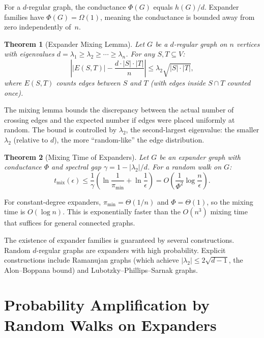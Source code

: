 \documentclass[twoside,12pt]{book}
\theoremstyle{plain}
\newtheorem{theorem}{Theorem}[chapter]
\theoremstyle{definition}
\theoremstyle{remark}
\begin{document}
For a $d$-regular graph, the conductance $\Phi(G)$ equals
$h(G)/d$. Expander families have $\Phi(G) = \Omega(1)$, meaning the
conductance is bounded away from zero independently of~$n$.

\begin{theorem}[Expander Mixing Lemma]\label{thm:exp-mixing}
Let $G$ be a $d$-regular graph on $n$ vertices with eigenvalues
$d = \lambda_1 \geq \lambda_2 \geq \cdots \geq \lambda_n$. For any
$S, T \subseteq V$:
\[
    \left| |E(S,T)| - \frac{d \cdot |S| \cdot |T|}{n} \right|
    \leq \lambda_2 \sqrt{|S| \cdot |T|},
\]
where $E(S,T)$ counts edges between $S$ and $T$ (with edges inside
$S \cap T$ counted once).
\end{theorem}

The mixing lemma bounds the discrepancy between the actual number of
crossing edges and the expected number if edges were placed uniformly at
random. The bound is controlled by $\lambda_2$, the second-largest
eigenvalue: the smaller $\lambda_2$ (relative to $d$), the more
``random-like'' the edge distribution.

\begin{theorem}[Mixing Time of Expanders]\label{thm:exp-mixing-time}
Let $G$ be an expander graph with conductance $\Phi$ and spectral gap
$\gamma = 1 - |\lambda_2|/d$. For a random walk on $G$:
\[
    t_{\mathrm{mix}}(\epsilon) \leq \frac{1}{\gamma}
    \left(\ln \frac{1}{\pi_{\min}} + \ln \frac{1}{\epsilon}\right)
    = O\!\left(\frac{1}{\Phi^2} \log \frac{n}{\epsilon}\right).
\]
\end{theorem}

For constant-degree expanders, $\pi_{\min} = \Theta(1/n)$ and
$\Phi = \Theta(1)$, so the mixing time is $O(\log n)$. This is
exponentially faster than the $O(n^3)$ mixing time that suffices for
general connected graphs.

The existence of expander families is guaranteed by several
constructions. Random $d$-regular graphs are expanders with high
probability. Explicit constructions include Ramanujan graphs (which
achieve $|\lambda_2| \leq 2\sqrt{d-1}$, the Alon--Boppana bound) and
Lubotzky--Phillips--Sarnak graphs.

\section{Probability Amplification by Random Walks on Expanders}
\label{sec:amplification}
\end{document}
